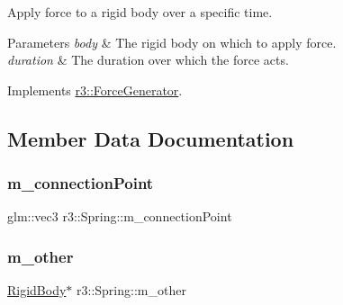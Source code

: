 Apply force to a rigid body over a specific time. 


\begin{DoxyParams}{Parameters}
{\em body} & The rigid body on which to apply force. \\
\hline
{\em duration} & The duration over which the force acts. \\
\hline
\end{DoxyParams}


Implements \mbox{\hyperlink{classr3_1_1_force_generator_a69bebbde8cef792d6636af50037af2aa}{r3\+::\+Force\+Generator}}.



\subsection{Member Data Documentation}
\mbox{\label{classr3_1_1_spring_a3c1e08e176ebc363b9f217875036955d}} 
\subsubsection{\texorpdfstring{m\+\_\+connection\+Point}{m\_connectionPoint}}
{\footnotesize\ttfamily glm\+::vec3 r3\+::\+Spring\+::m\+\_\+connection\+Point\hspace{0.3cm}{\ttfamily [protected]}}

\mbox{\label{classr3_1_1_spring_ac762f73af2e30d8f6f1e6b0a1575d49e}} 
\subsubsection{\texorpdfstring{m\+\_\+other}{m\_other}}
{\footnotesize\ttfamily \mbox{\hyperlink{classr3_1_1_rigid_body}{Rigid\+Body}}$\ast$ r3\+::\+Spring\+::m\+\_\+other\hspace{0.3cm}{\ttfamily [protected]}}

\mbox{\label{classr3_1_1_spring_a7a1c5a5c2960bbf756dac88986e939ae}} 
